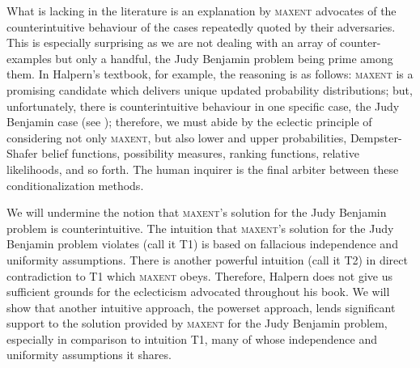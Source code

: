 \documentclass[12pt]{article}
\begin{document}

What is lacking in the literature is an explanation by \textsc{maxent}
advocates of the counterintuitive behaviour of the cases repeatedly
quoted by their adversaries. This is especially surprising as we are
not dealing with an array of counter-examples but only a handful, the
Judy Benjamin problem being prime among them. In Halpern's textbook,
for example, the reasoning is as follows: \textsc{maxent} is a
promising candidate which delivers unique updated probability
distributions; but, unfortunately, there is counterintuitive behaviour
in one specific case, the Judy Benjamin case (see
); therefore, we must abide by the
eclectic principle of considering not only \textsc{maxent}, but also
lower and upper probabilities, Dempster-Shafer belief functions,
possibility measures, ranking functions, relative likelihoods, and so
forth. The human inquirer is the final arbiter between these
conditionalization methods.

We will undermine the notion that \textsc{maxent}'s solution for the
Judy Benjamin problem is counterintuitive. The intuition that
\textsc{maxent}'s solution for the Judy Benjamin problem violates
(call it T1) is based on fallacious independence and uniformity
assumptions. There is another powerful intuition (call it T2) in
direct contradiction to T1 which \textsc{maxent} obeys. Therefore,
Halpern does not give us sufficient grounds for the eclecticism
advocated throughout his book. We will show that another intuitive
approach, the powerset approach, lends significant support to the
solution provided by \textsc{maxent} for the Judy Benjamin problem,
especially in comparison to intuition T1, many of whose independence
and uniformity assumptions it shares.
\end{document}
